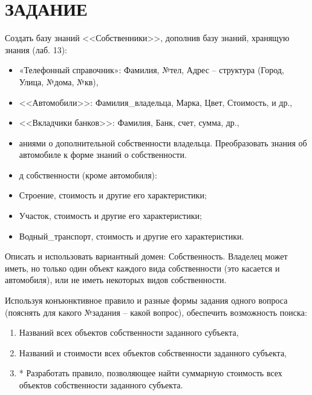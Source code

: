 \section{ЗАДАНИЕ}

Создать базу знаний <<Собственники>>, дополнив базу знаний, хранящую знания (лаб. 13):

\begin{itemize}
    \item «Телефонный справочник»: Фамилия, №тел, Адрес – структура (Город, Улица, №дома, №кв),
    \item <<Автомобили>>: Фамилия\_владельца, Марка, Цвет, Стоимость, и др.,
    \item <<Вкладчики банков>>: Фамилия, Банк, счет, сумма, др.,
    \item аниями о дополнительной собственности владельца. Преобразовать знания об автомобиле к форме знаний о собственности.
    \item д собственности (кроме автомобиля):
    \item Строение, стоимость и другие его характеристики;
    \item Участок, стоимость и другие его характеристики;
    \item Водный\_транспорт, стоимость и другие его характеристики.
\end{itemize}

Описать  и использовать вариантный домен: Собственность. Владелец может иметь, но только один объект каждого вида собственности (это касается и автомобиля), или не иметь некоторых видов собственности.

Используя конъюнктивное правило и разные формы задания одного вопроса (пояснять для какого №задания – какой вопрос), обеспечить возможность поиска:

\begin{enumerate}
    \item Названий всех объектов собственности заданного субъекта,
    \item Названий и стоимости всех объектов собственности заданного субъекта,
    \item * Разработать правило, позволяющее найти суммарную стоимость всех объектов собственности заданного субъекта.
\end{enumerate}

